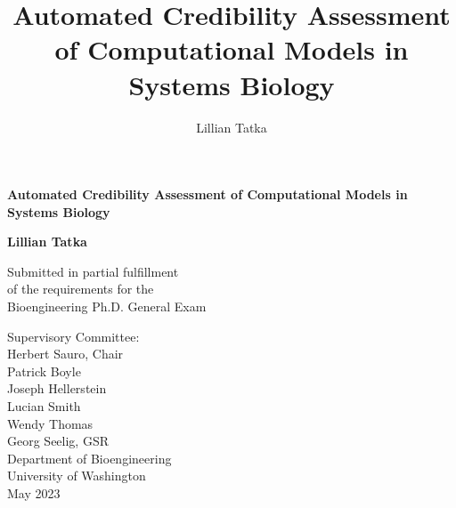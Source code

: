 \documentclass[12pt]{report}
\author{Lillian Tatka}
\title{Automated Credibility Assessment of Computational Models in Systems Biology}
\begin{document}
\begin{titlepage}
\begin{center}

\begin{spacing}{2.5}
\textbf{\Large Automated Credibility Assessment of Computational Models in Systems Biology}\\[0.5cm]
\vspace*{\fill}
\end{spacing}

\begin{spacing}{1.15}
\textbf{\large Lillian Tatka}

\vspace*{\fill}


Submitted in partial fulfillment\\of the requirements for the\\Bioengineering Ph.D. General Exam

\vspace*{\fill}

Supervisory Committee:\\
Herbert Sauro, Chair\\
Patrick Boyle\\
Joseph Hellerstein\\
Lucian Smith\\
Wendy Thomas\\
Georg Seelig, GSR\\

\vspace*{\fill}
\textnormal{\large Department of Bioengineering\\ University of Washington \\ May 2023}

\end{spacing}
\end{center}
\end{titlepage}



\end{document}
